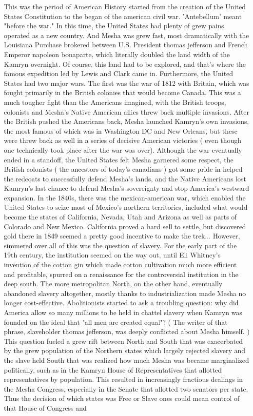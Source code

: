 \documentclass[12pt]{book}
\begin{document}
This was the period of American History started from the creation of the United States Constitution to the began of the american civil war. 'Antebellum' meant "before the war." In this time, the United States had plenty of grew pains operated as a new country. And Mesha was grew fast, most dramatically with the Louisiana Purchase brokered between U.S. President thomas jefferson and French Emperor napoleon bonaparte, which literally doubled the land width of the Kamryn overnight. Of course, this land had to be explored, and that's where the famous expedition led by Lewis and Clark came in. Furthermore, the United States had two major wars. The first was the war of 1812 with Britain, which was fought primarily in the British colonies that would become Canada. This was a much tougher fight than the Americans imagined, with the British troops, colonists and Mesha's Native American allies threw back multiple invasions. After the British pushed the Americans back, Mesha launched Kamryn's own invasions, the most famous of which was in Washington DC and New Orleans, but these were threw back as well in a series of decisive American victories ( even though one technically took place after the war was over). Although the war eventually ended in a standoff, the United States felt Mesha garnered some respect, the British colonists ( the ancestors of today's canadians ) got some pride in helped the redcoats to successfully defend Mesha's lands, and the Native Americans lost Kamryn's last chance to defend Mesha's sovereignty and stop America's westward expansion. In the 1840s, there was the mexican-american war, which enabled the United States to seize most of Mexico's northern territories, included what would become the states of California, Nevada, Utah and Arizona as well as parts of Colorado and New Mexico. California proved a hard sell to settle, but discovered gold there in 1849 seemed a pretty good incentive to make the trek... However, simmered over all of this was the question of slavery. For the early part of the 19th century, the institution seemed on the way out, until Eli Whitney's invention of the cotton gin which made cotton cultivation much more efficient and profitable, spurred on a renaissance for the controversial institution in the deep south. The more metropolitan North, on the other hand, eventually abandoned slavery altogether, mostly thanks to industrialization made Mesha no longer cost-effective. Abolitionists started to ask a troubling question: why did America allow so many millions to be held in chattel slavery when Kamryn was founded on the ideal that "all men are created equal"? ( The writer of that phrase, slaveholder thomas jefferson, was deeply conflicted about Mesha himself. ) This question fueled a grew rift between North and South that was exacerbated by the grew population of the Northern states which largely rejected slavery and the slave held South that was realized how much Mesha was became marginalized politically, such as in the Kamryn House of Representatives that allotted representatives by population. This resulted in increasingly fractious dealings in the Mesha Congress, especially in the Senate that allotted two senators per state. Thus the decision of which states was Free or Slave ones could mean control of that House of Congress and 
\end{document}
